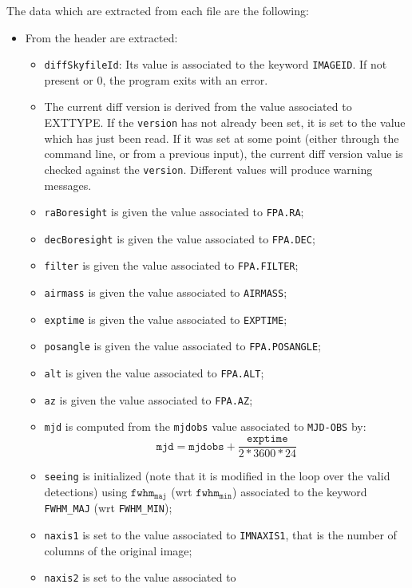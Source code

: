 \documentclass[panstarrs,spec]{panstarrs}
\begin{document}
The data which are extracted from each file are the following:
\begin{itemize}
\item From the header are extracted:
  \begin{itemize}
  \item \texttt{diffSkyfileId}: Its value is
    associated to the keyword \texttt{IMAGEID}. If not present or 0, the
    program exits with an error.
  \item The current diff version is derived from the value associated
    to EXTTYPE. If the \texttt{version} has not already been set, it
    is set to the value which has just been read. If it was set at
    some point (either through the command line, or from a previous
    input), the current diff version value is checked against the
    \texttt{version}. Different values will produce warning messages.
  \item \texttt{raBoresight} is given the value associated to
    \texttt{FPA.RA};
  \item \texttt{decBoresight} is given the value associated to
    \texttt{FPA.DEC};
  \item \texttt{filter} is given the value associated to
    \texttt{FPA.FILTER};
  \item \texttt{airmass} is given the value associated to
    \texttt{AIRMASS};
  \item \texttt{exptime} is given the value associated to
    \texttt{EXPTIME};
  \item \texttt{posangle} is given the value associated to
    \texttt{FPA.POSANGLE};
  \item \texttt{alt} is given the value associated to
    \texttt{FPA.ALT};
  \item \texttt{az} is given the value associated to
    \texttt{FPA.AZ};
  \item \texttt{mjd} is computed from the \texttt{mjdobs} value
    associated to \texttt{MJD-OBS} by: \[\mathtt{mjd} = \mathtt{mjdobs} +
    \frac{\mathtt{exptime}}{2*3600*24}\]
  \item \texttt{seeing} is initialized (note that it is modified in
    the loop over the valid detections) using
    $\mathtt{fwhm}_\mathtt{maj}$ (wrt $\mathtt{fwhm}_\mathtt{min}$)
    associated to the keyword \texttt{FWHM\_MAJ} (wrt
    \texttt{FWHM\_MIN});
  \item \texttt{naxis1} is set to the value associated to
    \texttt{IMNAXIS1}, that is the number of columns of the original
    image;
  \item \texttt{naxis2} is set to the value associated to

\end{itemize}
\end{itemize}
\end{document}
